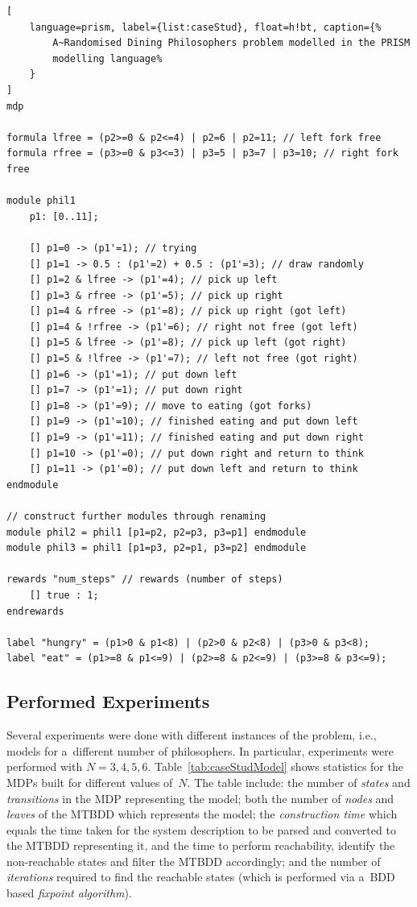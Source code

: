 \documentclass[a4paper, 11pt]{article}
\theoremstyle{definition}
\begin{document}
\begin{lstlisting}[
    language=prism, label={list:caseStud}, float=h!bt, caption={%
        A~Randomised Dining Philosophers problem modelled in the PRISM
        modelling language%
    }
]
mdp

formula lfree = (p2>=0 & p2<=4) | p2=6 | p2=11; // left fork free
formula rfree = (p3>=0 & p3<=3) | p3=5 | p3=7 | p3=10; // right fork free

module phil1
    p1: [0..11];

    [] p1=0 -> (p1'=1); // trying
    [] p1=1 -> 0.5 : (p1'=2) + 0.5 : (p1'=3); // draw randomly
    [] p1=2 & lfree -> (p1'=4); // pick up left
    [] p1=3 & rfree -> (p1'=5); // pick up right
    [] p1=4 & rfree -> (p1'=8); // pick up right (got left)
    [] p1=4 & !rfree -> (p1'=6); // right not free (got left)
    [] p1=5 & lfree -> (p1'=8); // pick up left (got right)
    [] p1=5 & !lfree -> (p1'=7); // left not free (got right)
    [] p1=6 -> (p1'=1); // put down left
    [] p1=7 -> (p1'=1); // put down right
    [] p1=8 -> (p1'=9); // move to eating (got forks)
    [] p1=9 -> (p1'=10); // finished eating and put down left
    [] p1=9 -> (p1'=11); // finished eating and put down right
    [] p1=10 -> (p1'=0); // put down right and return to think
    [] p1=11 -> (p1'=0); // put down left and return to think
endmodule

// construct further modules through renaming
module phil2 = phil1 [p1=p2, p2=p3, p3=p1] endmodule
module phil3 = phil1 [p1=p3, p2=p1, p3=p2] endmodule

rewards "num_steps" // rewards (number of steps)
    [] true : 1;
endrewards

label "hungry" = (p1>0 & p1<8) | (p2>0 & p2<8) | (p3>0 & p3<8);
label "eat" = (p1>=8 & p1<=9) | (p2>=8 & p2<=9) | (p3>=8 & p3<=9);
\end{lstlisting}

\subsection{Performed Experiments}
\label{sec:caseStudExps}

Several experiments were done with different instances of the problem,
i.e., models for a~different number of philosophers. In particular,
experiments were performed with $ N = 3, 4, 5, 6 $.
Table~\ref{tab:caseStudModel} shows statistics for the MDPs built for
different values of~$ N $. The table include: the number of \emph{states}
and \emph{transitions} in the MDP representing the model; both the number
of \emph{nodes} and \emph{leaves} of the MTBDD which represents the
model; the \emph{construction time} which equals the time taken for the
system description to be parsed and converted to the MTBDD representing
it, and the time to perform reachability, identify the non-reachable
states and filter the MTBDD accordingly; and the number of
\emph{iterations} required to find the reachable states (which is
performed via a~BDD based \emph{fixpoint algorithm}).
\end{document}
